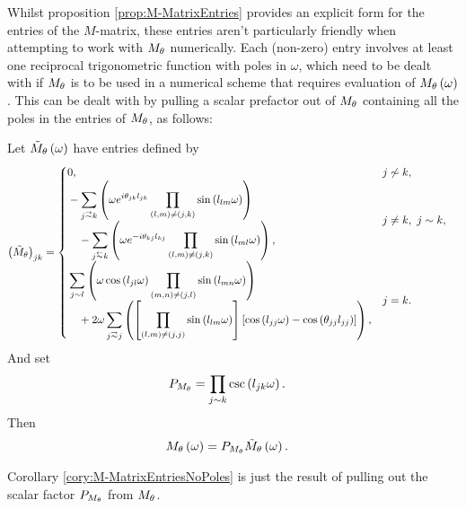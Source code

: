 Whilst proposition \ref{prop:M-MatrixEntries} provides an explicit form for the entries of the $M$-matrix, these entries aren't particularly friendly when attempting to work with $M_\theta$ numerically.
Each (non-zero) entry involves at least one reciprocal trigonometric function with poles in $\omega$, which need to be dealt with if $M_\theta$ is to be used in a numerical scheme that requires evaluation of $M_\theta\left( \omega \right)$.
This can be dealt with by pulling a scalar prefactor out of $M_\theta$ containing all the poles in the entries of $M_\theta$, as follows:
\begin{cory} \label{cory:M-MatrixEntriesNoPoles}
	Let $\tilde{M}_\theta\left( \omega \right)$ have entries defined by
	\begin{align*}
		\bracs{\tilde{M}_\qm}_{jk} &= 
		\begin{cases}
			\!\begin{aligned}
				&0,
			\end{aligned}			
			& j \not\con k, \\
			\!\begin{aligned}
				&-\sum_{j\conLeft k} \bracs{ \omega e^{i\qm_{jk}l_{jk}} \prod_{\bracs{l,m} \neq \bracs{j,k}}\sin\bracs{l_{lm}\omega} }
				\\ &\quad - \sum_{j\conRight k} \bracs{ \omega e^{-i\qm_{kj}l_{kj}} \prod_{\bracs{l,m} \neq \bracs{j,k}}\sin\bracs{l_{ml}\omega} },
			\end{aligned}
			& j\neq k, \ j\con k, \\
			\!\begin{aligned}
				&\sum_{j\con l} \bracs{ \omega\cos\bracs{l_{jl}\omega}\prod_{\bracs{m,n}\neq\bracs{j,l}}\sin\bracs{l_{mn}\omega} }
				\\ &\quad + 2\omega\sum_{j\conLeft j} \bracs{ \sqbracs{ \prod_{\bracs{l,m}\neq\bracs{j,j}}\sin\bracs{l_{lm}\omega} }\sqbracs{ \cos\bracs{l_{jj}\omega} - \cos\bracs{\qm_{jj}l_{jj}} } },
			\end{aligned}
			& j=k.
		\end{cases}
	\end{align*}
	And set
	\begin{align*}
		P_{M_\theta} &= \prod_{j\sim k}\csc\left( l_{jk}\omega \right).
	\end{align*}
	Then
	\begin{align*}
		M_\theta\left( \omega \right) &= P_{M_\theta}\tilde{M}_\theta\left( \omega \right).
	\end{align*}
\end{cory}
Corollary \ref{cory:M-MatrixEntriesNoPoles} is just the result of pulling out the scalar factor $P_{M_\theta}$ from $M_\theta$.
